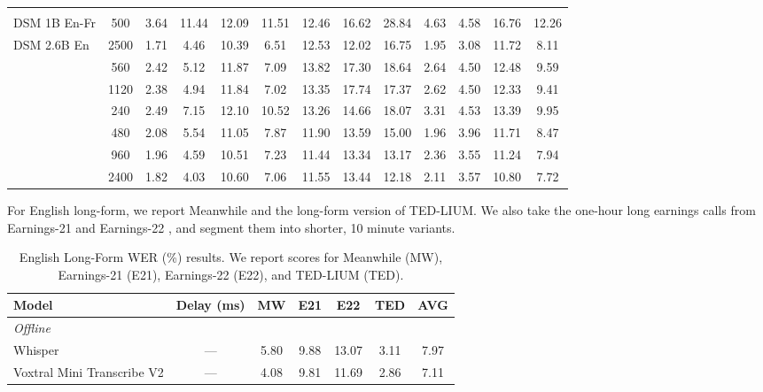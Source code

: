\begin{landscape}
\begin{table}[h]
\begin{tabular}{lcccccccccccc}
\addlinespace[0.6em]
\multicolumn{13}{l}{\textit{Realtime Open-Source}} \\
\cmidrule(lr){1-13}
DSM 1B En-Fr & 500 & 3.64 & 11.44 & 12.09 & 11.51 & 12.46 & 16.62 & 28.84 & 4.63 & 4.58 & 16.76 & 12.26 \\
DSM 2.6B En & 2500 & 1.71 & 4.46 & 10.39 & 6.51 & 12.53 & 12.02 & 16.75 & 1.95 & 3.08 & 11.72 & 8.11 \\
\addlinespace
\multirow[t]{2}{*}{Nemotron Streaming} & 560 & 2.42 & 5.12 & 11.87 & 7.09 & 13.82 & 17.30 & 18.64 & 2.64 & 4.50 & 12.48 & 9.59 \\
 & 1120 & 2.38 & 4.94 & 11.84 & 7.02 & 13.35 & 17.74 & 17.37 & 2.62 & 4.50 & 12.33 & 9.41 \\
\addlinespace
\multirow[t]{4}{*}{Voxtral Realtime} & 240 & 2.49 & 7.15 & 12.10 & 10.52 & 13.26 & 14.66 & 18.07 & 3.31 & 4.53 & 13.39 & 9.95 \\
 & 480 & 2.08 & 5.54 & 11.05 & 7.87 & 11.90 & 13.59 & 15.00 & 1.96 & 3.96 & 11.71 & 8.47 \\
 & 960 & 1.96 & 4.59 & 10.51 & 7.23 & 11.44 & 13.34 & 13.17 & 2.36 & 3.55 & 11.24 & 7.94 \\
 & 2400 & 1.82 & 4.03 & 10.60 & 7.06 & 11.55 & 13.44 & 12.18 & 2.11 & 3.57 & 10.80 & 7.72 \\
\bottomrule
\end{tabular}
\end{table}



For English long-form, we report Meanwhile \citep{radford2023whisper} and the long-form version of TED-LIUM. We also take the one-hour long earnings calls from Earnings-21 \citep{delrio21_earnings21} and Earnings-22 \citep{delrio22_earnings22}, and segment them into shorter, 10 minute variants.

\begin{table}[h]
\centering
\caption{English Long-Form WER (\%) results. We report scores for Meanwhile (MW), Earnings-21 (E21), Earnings-22 (E22), and TED-LIUM (TED).}
\label{tab:en-long}
\small
\begin{tabular}{lcccccc}
\toprule
\textbf{Model} & \textbf{Delay (ms)} & \textbf{MW} & \textbf{E21} & \textbf{E22} & \textbf{TED} & \textbf{AVG} \\
\midrule

\multicolumn{7}{l}{\textit{Offline}} \\
\cmidrule(lr){1-7}
Whisper & — & 5.80 & 9.88 & 13.07 & 3.11 & 7.97 \\
Voxtral Mini Transcribe V2 & — & 4.08 & 9.81 & 11.69 & 2.86 & 7.11 \\


\end{tabular}
\end{table}
\end{landscape}
